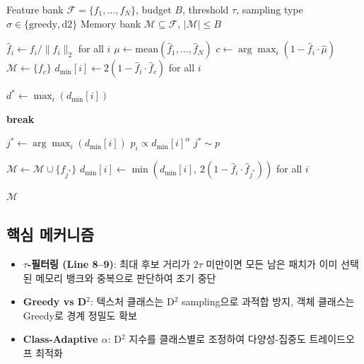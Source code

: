 \documentclass[11pt,a4paper]{article}
\begin{document}
\begin{algorithm}[H]
\caption{CC-IFPS: Class-Conditioned Irredundant Feature Patch Selection}
\label{alg:ccifps}
\begin{algorithmic}[1]
\Require Feature bank $\mathcal{F} = \{f_1, \ldots, f_N\}$, budget $B$, threshold $\tau$, sampling type $\sigma \in \{\text{greedy}, \text{d2}\}$
\Ensure Memory bank $\mathcal{M} \subseteq \mathcal{F}$, $|\mathcal{M}| \leq B$

\State $\hat{f}_i \leftarrow f_i / \|f_i\|_2$ for all $i$ 
\State $\mu \leftarrow \text{mean}(\hat{f}_1, \ldots, \hat{f}_N)$
\State $c \leftarrow \arg\max_i (1 - \hat{f}_i \cdot \hat{\mu})$ 
\State $\mathcal{M} \leftarrow \{f_c\}$
\State $d_{\min}[i] \leftarrow 2(1 - \hat{f}_i \cdot \hat{f}_c)$ for all $i$ 

  \State $d^* \leftarrow \max_i(d_{\min}[i])$ 
  
   
    \State \textbf{break} 
  \EndIf
  
    \State $j^* \leftarrow \arg\max_i(d_{\min}[i])$ 
    \State $p_i \propto d_{\min}[i]^\alpha$ 
    \State $j^* \sim p$
  \EndIf
  
  \State $\mathcal{M} \leftarrow \mathcal{M} \cup \{f_{j^*}\}$
  \State $d_{\min}[i] \leftarrow \min(d_{\min}[i],\ 2(1 - \hat{f}_i \cdot \hat{f}_{j^*}))$ for all $i$
\EndFor

\State \Return $\mathcal{M}$
\end{algorithmic}
\end{algorithm}

\subsection{핵심 메커니즘}

\begin{itemize}
  \item \textbf{$\tau$-필터링 (Line 8--9)}: 최대 후보 거리가 $2\tau$ 미만이면 모든 남은 패치가 이미 선택된 메모리 뱅크와 중복으로 판단하여 조기 중단
  \item \textbf{Greedy vs D$^2$}: 텍스처 클래스는 D$^2$ sampling으로 과적합 방지, 객체 클래스는 Greedy로 경계 정밀도 확보
  \item \textbf{Class-Adaptive $\alpha$}: D$^2$ 지수를 클래스별로 조정하여 다양성-집중도 트레이드오프 최적화
\end{itemize}
\end{document}
